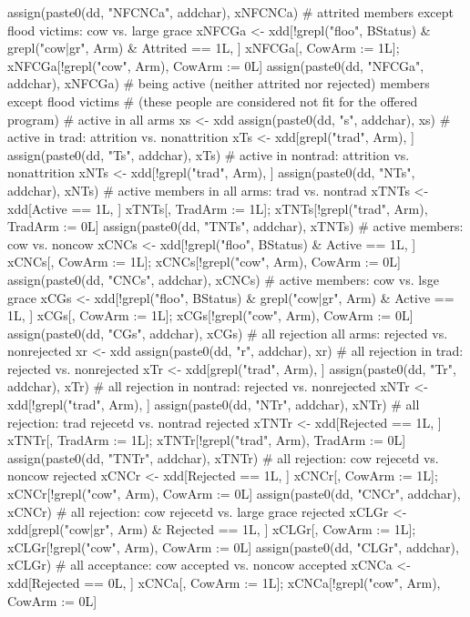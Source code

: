 \begin{Schunk}
\begin{Sinput}
{{    assign(paste0(dd, "NFCNCa", addchar), xNFCNCa)
    # attrited members except flood victims: cow vs. large grace
    xNFCGa <- xdd[!grepl("floo", BStatus) & grepl("cow|gr", Arm) & Attrited == 1L, ]
    xNFCGa[, CowArm := 1L]; xNFCGa[!grepl("cow", Arm), CowArm := 0L]
    assign(paste0(dd, "NFCGa", addchar), xNFCGa)
    # being active (neither attrited nor rejected) members except flood victims 
    # (these people are considered not fit for the offered program)
    # active in all arms
    xs <- xdd
    assign(paste0(dd, "s", addchar), xs)
    # active in trad: attrition vs. nonattrition
    xTs <- xdd[grepl("trad", Arm), ]
    assign(paste0(dd, "Ts", addchar), xTs)
    # active in nontrad: attrition vs. nonattrition
    xNTs <- xdd[!grepl("trad", Arm), ]
    assign(paste0(dd, "NTs", addchar), xNTs)
    # active members in all arms: trad vs. nontrad
    xTNTs <- xdd[Active == 1L, ]
    xTNTs[, TradArm := 1L]; xTNTs[!grepl("trad", Arm), TradArm := 0L]
    assign(paste0(dd, "TNTs", addchar), xTNTs)
    # active members: cow vs. noncow
    xCNCs <- xdd[!grepl("floo", BStatus) & Active == 1L, ]
    xCNCs[, CowArm := 1L]; xCNCs[!grepl("cow", Arm), CowArm := 0L]
    assign(paste0(dd, "CNCs", addchar), xCNCs)
    # active members: cow vs. lsge grace
    xCGs <- xdd[!grepl("floo", BStatus) & grepl("cow|gr", Arm) & Active == 1L, ]
    xCGs[, CowArm := 1L]; xCGs[!grepl("cow", Arm), CowArm := 0L]
    assign(paste0(dd, "CGs", addchar), xCGs)
    # all rejection all arms: rejected vs. nonrejected
    xr <- xdd
    assign(paste0(dd, "r", addchar), xr)
    # all rejection in trad: rejected vs. nonrejected
    xTr <- xdd[grepl("trad", Arm), ]
    assign(paste0(dd, "Tr", addchar), xTr)
    # all rejection in nontrad: rejected vs. nonrejected
    xNTr <- xdd[!grepl("trad", Arm), ]
    assign(paste0(dd, "NTr", addchar), xNTr)
    # all rejection: trad rejecetd vs. nontrad rejected
    xTNTr <- xdd[Rejected == 1L, ]
    xTNTr[, TradArm := 1L]; xTNTr[!grepl("trad", Arm), TradArm := 0L]
    assign(paste0(dd, "TNTr", addchar), xTNTr)
    # all rejection: cow rejecetd vs. noncow rejected
    xCNCr <- xdd[Rejected == 1L, ]
    xCNCr[, CowArm := 1L]; xCNCr[!grepl("cow", Arm), CowArm := 0L]
    assign(paste0(dd, "CNCr", addchar), xCNCr)
    # all rejection: cow rejecetd vs. large grace rejected
    xCLGr <- xdd[grepl("cow|gr", Arm) & Rejected == 1L, ]
    xCLGr[, CowArm := 1L]; xCLGr[!grepl("cow", Arm), CowArm := 0L]
    assign(paste0(dd, "CLGr", addchar), xCLGr)
    # all acceptance: cow accepted vs. noncow accepted
    xCNCa <- xdd[Rejected == 0L, ]
    xCNCa[, CowArm := 1L]; xCNCa[!grepl("cow", Arm), CowArm := 0L]
}}
\end{Sinput}
\end{Schunk}
